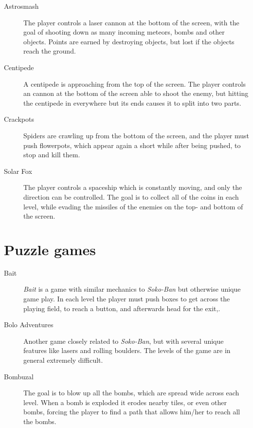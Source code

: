 \documentclass[a4paper,titlepage,final]{report}
\begin{document}
\begin{appendices}
\begin{description}
\item [Astrosmash]  \citep{game:astrosmash} The player controls a laser cannon at the bottom of the screen, with the goal of shooting down as many incoming meteors, bombs and other objects. Points are earned by destroying objects, but lost if the objects reach the ground.
\item [Centipede] \citep{game:centipede} A centipede is approaching from the top of the screen. The player controls an cannon at the bottom of the screen able to shoot the enemy, but hitting the centipede in everywhere but its ends causes it to split into two parts.
\item [Crackpots] \citep{game:crackpots} Spiders are crawling up from the bottom of the screen, and the player must push flowerpots, which appear again a short while after being pushed, to stop and kill them. 
\item [Solar Fox] \citep{game:solarfox} The player controls a spaceship which is constantly moving, and only the direction can be controlled. The goal is to collect all of the coins in each level, while evading the missiles of the enemies on the top- and bottom of the screen.
\end{description}


\section{Puzzle games}

\begin{description}
\item [Bait] \citep{game:bait} \textit{Bait} is a game with similar mechanics to \textit{Soko-Ban} but otherwise unique game play. In each level the player must push boxes to get across the playing field, to reach a button, and afterwards head for the exit,.
\item [Bolo Adventures] \citep{game:boloadventures} Another game closely related to \textit{Soko-Ban}, but with several unique features like lasers and rolling boulders. The levels of the game are in general extremely difficult.
\item [Bombuzal] \citep{game:bombuzal} The goal is to blow up all the bombs, which are spread wide across each level. When a bomb is exploded it erodes nearby tiles, or even other bombs, forcing the player to find a path that allows him/her to reach all the bombs.


\end{description}
\end{appendices}
\end{document}
